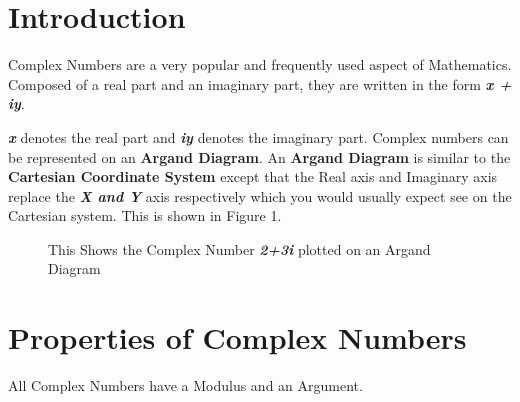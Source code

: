 \section{Introduction}

Complex Numbers are a very popular and frequently used aspect of Mathematics. Composed of a real part and an imaginary part, they are written in the form \textit{\textbf{x + iy}}. 

\textit{\textbf{x}} denotes the real part and \textit{\textbf{iy}} denotes the imaginary part. Complex numbers can be represented on an \textbf{Argand Diagram}. An \textbf{Argand Diagram} is similar to the \textbf{Cartesian Coordinate System} except that the Real axis and Imaginary axis replace the  \textit{\textbf{X \textit{\textbf{and}} Y}} axis respectively which you would usually expect see on the Cartesian system. This is shown in Figure 1.
\begin{figure}[!htbp]
\begin{center}
\end{center}
\caption{This Shows the Complex Number \textit{\textbf{2+3i}} plotted on an Argand Diagram}

 
\end{figure}


\section{Properties of Complex Numbers}

All Complex Numbers have a Modulus and an Argument. 

